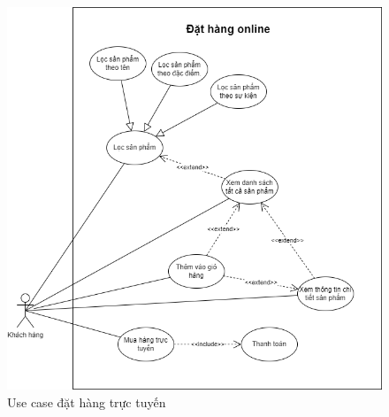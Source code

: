     \begin{figure}[!htp]
        \centering
        \includegraphics[width=12cm]{img/UseCase/UseCase-Đặt hàng.drawio.png}
        \newline
        \caption{Use case đặt hàng trực tuyến}
    \end{figure}
